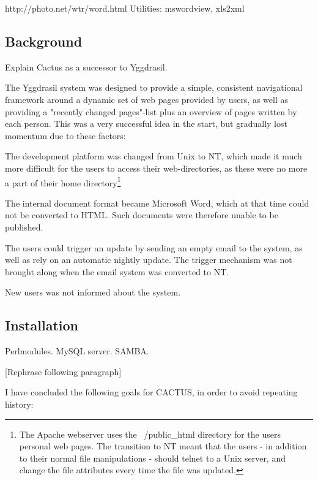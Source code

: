 http://photo.net/wtr/word.html
Utilities:  mswordview, xls2xml

\subsection{Background}



Explain Cactus as a successor to Yggdrasil.

The Yggdrasil system was designed to provide a simple, consistent
navigational framework around a dynamic set of web pages provided by
users, as well as providing a "recently changed pages"-list plus an
overview of pages written by each person.  This was a very successful
idea in the start, but gradually lost momentum due to these factors:

The development platform was changed from Unix to NT, which made it
much more difficult for the users to access their web-directories, as
these were no more a part of their home directory\footnote{The Apache
  webserver uses the ~/public\_html directory for the users personal
  web pages.  The transition to NT meant that the users - in addition
  to their normal file manipulations - should telnet to a Unix server,
  and change the file attributes every time the file was updated.  }

The internal document format became Microsoft Word, which at that time
could not be converted to HTML.  Such documents were therefore unable
to be published.

The users could trigger an update by sending an empty email to the
system, as well as rely on an automatic nightly update.  The trigger
mechanism was not brought along when the email system was converted to
NT.

New users was not informed about the system.

\subsection{Installation}
Perlmodules.  MySQL server. SAMBA.


[Rephrase following paragraph]

I have concluded the following goals for CACTUS, in order to avoid
repeating history:

